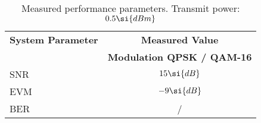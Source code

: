 \begin{table}[htbp]
  \centering
  \caption{Measured performance parameters. Transmit power: $\measPWRbad \si{dBm}$}
    \begin{tabular}{lc}
    \rowcolor[rgb]{ 0,  0,  0} \textcolor[rgb]{ 1,  1,  1}{\textbf{System Parameter}}	& \textcolor[rgb]{ 1,  1,  1}{\textbf{Measured Value}} 		\\
    \rowcolor[rgb]{ 0,  0,  0} \textcolor[rgb]{ 1,  1,  1}{} & \textcolor[rgb]{ 1,  1,  1}{\textbf{Modulation QPSK / QAM-16}}					\\

    	SNR														& $\measSNRGood\si{dB}$						\\
    	EVM 													& $\measEVMGood \si{dB}$						\\
    	BER			 											& \measBERQPSKGood / \measBERQAMGood		\\
 \end{tabular}
  \label{tab:meas_params_bad}
\end{table}
